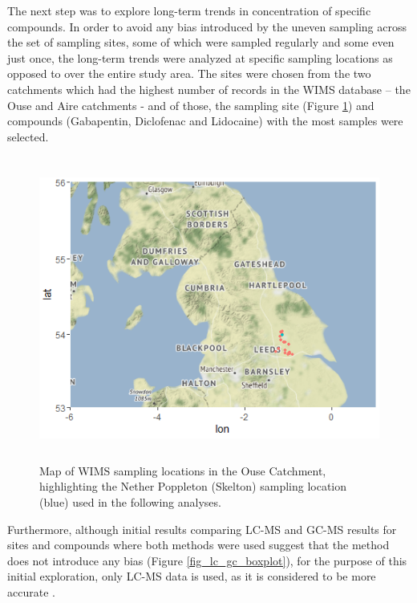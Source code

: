 \documentclass{article}
\begin{document}
The next step was to explore long-term trends in concentration of specific compounds. In order to avoid any bias introduced by the uneven sampling across the set of sampling sites, some of which were sampled regularly and some even just once, the long-term trends were analyzed at specific sampling locations as opposed to over the entire study area. The sites were chosen from the two catchments which had the highest number of records in the WIMS database – the Ouse and Aire catchments - and of those, the sampling site (Figure \ref{fig_ouse_site_map}) and compounds (Gabapentin, Diclofenac and Lidocaine) with the most samples were selected. 

\begin{figure}[h]
    \centering
    \includegraphics[height=10cm]{fig_ouse_site_map.png}
    \caption{Map of WIMS sampling locations in the Ouse Catchment, highlighting the Nether Poppleton (Skelton) sampling location (blue) used in the following analyses.}
    \label{fig_ouse_site_map}
\end{figure}

Furthermore, although initial results comparing LC-MS and GC-MS results for sites and compounds where both methods were used suggest that the method does not introduce any bias (Figure \ref{fig_lc_gc_boxplot}), for the purpose of this initial exploration, only LC-MS data is used, as it is considered to be more accurate \citep{Stout2009ABenzoylecgonine}.
\end{document}
